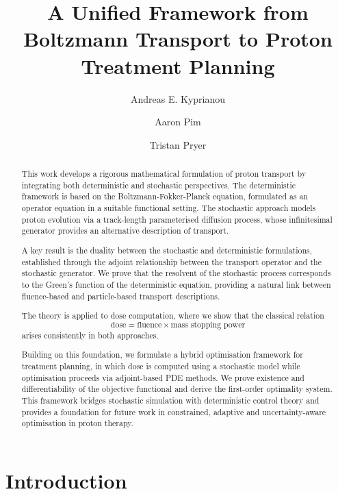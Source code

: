 \documentclass{amsart}
\author{
  Andreas E. Kyprianou
}
\author{
   Aaron Pim
}
\author{
  Tristan Pryer
}
\theoremstyle{plain}
\begin{document}
\title{A Unified Framework from Boltzmann Transport to Proton Treatment Planning}

\maketitle

\begin{abstract}
  This work develops a rigorous mathematical formulation of proton
  transport by integrating both deterministic and stochastic
  perspectives. The deterministic framework is based on the
  Boltzmann-Fokker-Planck equation, formulated as an operator equation
  in a suitable functional setting. The stochastic approach models
  proton evolution via a track-length parameterised diffusion process,
  whose infinitesimal generator provides an alternative description of
  transport.

  A key result is the duality between the stochastic and deterministic
  formulations, established through the adjoint relationship between
  the transport operator and the stochastic generator. We prove that
  the resolvent of the stochastic process corresponds to the Green’s
  function of the deterministic equation, providing a natural link
  between fluence-based and particle-based transport descriptions.

  The theory is applied to dose computation, where we show that the
  classical relation
  \begin{equation*}
    \text{dose} = \text{fluence} \times \text{mass stopping power}
  \end{equation*}
  arises consistently in both approaches.

  Building on this foundation, we formulate a hybrid optimisation
  framework for treatment planning, in which dose is computed using a
  stochastic model while optimisation proceeds via adjoint-based PDE
  methods. We prove existence and differentiability of the objective
  functional and derive the first-order optimality system. This
  framework bridges stochastic simulation with deterministic control
  theory and provides a foundation for future work in constrained,
  adaptive and uncertainty-aware optimisation in proton therapy.
\end{abstract}

\section{Introduction}
\label{sec:intro}
\end{document}
